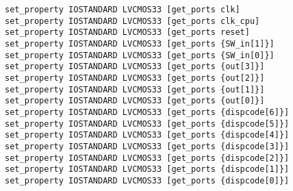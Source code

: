 \begin{multicols}{2}
\begin{lstlisting}
set_property IOSTANDARD LVCMOS33 [get_ports clk]
set_property IOSTANDARD LVCMOS33 [get_ports clk_cpu]
set_property IOSTANDARD LVCMOS33 [get_ports reset]
set_property IOSTANDARD LVCMOS33 [get_ports {SW_in[1]}]
set_property IOSTANDARD LVCMOS33 [get_ports {SW_in[0]}]
set_property IOSTANDARD LVCMOS33 [get_ports {out[3]}]
set_property IOSTANDARD LVCMOS33 [get_ports {out[2]}]
set_property IOSTANDARD LVCMOS33 [get_ports {out[1]}]
set_property IOSTANDARD LVCMOS33 [get_ports {out[0]}]
set_property IOSTANDARD LVCMOS33 [get_ports {dispcode[6]}]
set_property IOSTANDARD LVCMOS33 [get_ports {dispcode[5]}]
set_property IOSTANDARD LVCMOS33 [get_ports {dispcode[4]}]
set_property IOSTANDARD LVCMOS33 [get_ports {dispcode[3]}]
set_property IOSTANDARD LVCMOS33 [get_ports {dispcode[2]}]
set_property IOSTANDARD LVCMOS33 [get_ports {dispcode[1]}]
set_property IOSTANDARD LVCMOS33 [get_ports {dispcode[0]}]
\end{lstlisting}
\end{multicols}